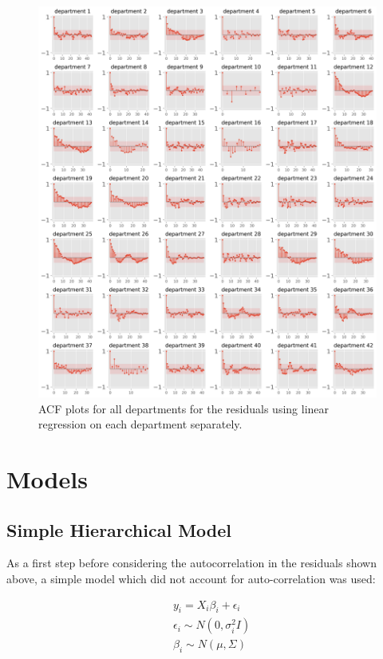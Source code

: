 \documentclass[paper=a4, fontsize=11pt]{scrartcl}
\begin{document}
\begin{figure}[!htb]\label{autocorr}
\centering
\includegraphics[width=1\textwidth]{acf_plots1.png}
\caption{ACF plots for all departments for the residuals using linear regression on each department separately.}
\end{figure}

\newpage
\section{Models}
\subsection{Simple Hierarchical Model}
As a first step before considering the autocorrelation in the residuals shown above, a simple model which did not account for auto-correlation was used:


\begin{align*}
    &y_i = X_i \beta_i+ \epsilon_i \\
     &\epsilon_i \sim N(0, \sigma^2_i I)\\
      &\beta_i \sim N(\mu, \Sigma)
\end{align*}
\end{document}
